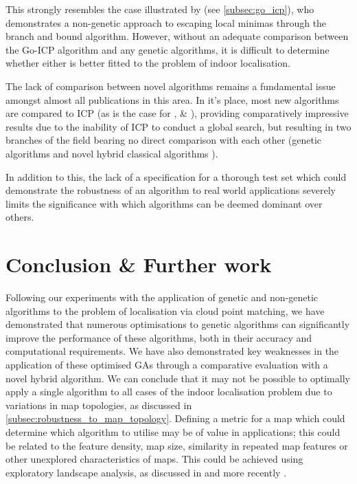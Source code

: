 \documentclass[authoryearcitations]{UoYCSproject}
\begin{document}
This strongly resembles the case illustrated by \citeauthor{Yang2013-gx} (see \autoref{subsec:go_icp}), who demonstrates a non-genetic approach to escaping local minimas through the branch and bound algorithm. However, without an adequate comparison between the Go-ICP algorithm and any genetic algorithms, it is difficult to determine whether either is better fitted to the problem of indoor localisation. \newline

The lack of comparison between novel algorithms remains a fundamental issue amongst almost all publications in this area. In it's place, most new algorithms are compared to ICP (as is the case for \cite{Lenac2007-xm}, \cite{Lomonosov2006-vq} \& \cite{Yang2013-gx}), providing comparatively impressive results due to the inability of ICP to conduct a global search, but resulting in two branches of the field bearing no direct comparison with each other (genetic algorithms \cite{Lenac2007-xm} \cite{Lenac2011-co} \cite{Ze-Su2007-li} and novel hybrid classical algorithms \cite{Yang2013-gx} \cite{Ma2016-es}).  \newline

In addition to this, the lack of a specification for a thorough test set which could demonstrate the robustness of an algorithm to real world applications severely limits the significance with which algorithms can be deemed dominant over others. \newline

\section{Conclusion \& Further work}
\label{sec:conclusion}
Following our experiments with the application of genetic and non-genetic algorithms to the problem of localisation via cloud point matching, we have demonstrated that numerous optimisations to genetic algorithms can significantly improve the performance of these algorithms, both in their accuracy and computational requirements. We have also demonstrated key weaknesses in the application of these optimised GAs through a comparative evaluation with a novel hybrid algorithm. We can conclude that it may not be possible to optimally apply a single algorithm to all cases of the indoor localisation problem due to variations in map topologies, as discussed in \autoref{subsec:robustness_to_map_topology}.  Defining a metric for a map which could determine which algorithm to utilise may be of value in applications; this could be related to the feature density, map size, similarity in repeated map features or other unexplored characteristics of maps. This could be achieved using exploratory landscape analysis, as discussed in \citet{Mitchell1992-fl} and more recently \citet{Mersmann2011-jm}. \newline
\end{document}
